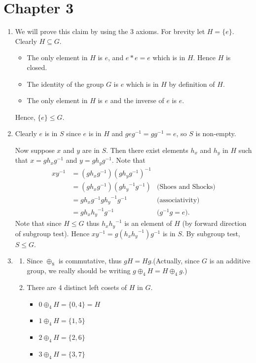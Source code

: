 \section*{Chapter 3}
\begin{enumerate}
    \item We will prove this claim by using the 3 axioms. For brevity let $H = \{e\}$. Clearly $H \subseteq G$.
    \begin{itemize}
        \item The only element in $H$ is $e$, and $e \ast e = e$ which is in $H$. Hence $H$ is closed.
        \item The identity of the group $G$ is $e$ which is in $H$ by definition of $H$.
        \item The only element in $H$ is $e$ and the inverse of $e$ is $e$.
    \end{itemize}
    Hence, $\{e\} \leq G$.

    \item Clearly $e$ is in $S$ since $e$ is in $H$ and $geg^{-1} = gg^{-1} = e$, so $S$ is non-empty.

    Now suppose $x$ and $y$ are in $S$. Then there exist elements $h_x$ and $h_y$ in $H$ such that $x = gh_xg^{-1}$ and $y = gh_yg^{-1}$. Note that
    \begin{align*}
        xy^{-1} &= (gh_xg^{-1})(gh_yg^{-1})^{-1}\\
        &= (gh_xg^{-1})(g{h_y}^{-1}g^{-1}) & \text{(Shoes and Shocks)}\\
        &= gh_xg^{-1}g{h_y}^{-1}g^{-1} & \text{(associativity)}\\
        &= gh_x{h_y}^{-1}g^{-1} & \text{(}g^{-1}g = e\text{)}.
    \end{align*}
    Note that since $H \leq G$ thus $h_x{h_y}^{-1}$ is an element of $H$ (by forward direction of subgroup test). Hence $xy^{-1} = g(h_x{h_y}^{-1})g^{-1}$ is in $S$. By subgroup test, $S \leq G$.

    \item \begin{enumerate}[label=(\alph*)]
        \item Since $\oplus_8$ is commutative, thus $gH = Hg$.\newline(Actually, since $G$ is an additive group, we really should be writing $g \oplus_4 H = H \oplus_4 g$.)
        \item There are 4 distinct left cosets of $H$ in $G$.
        \begin{itemize}
            \item $0 \oplus_4 H = \{0, 4\} = H$
            \item $1 \oplus_4 H = \{1, 5\}$
            \item $2 \oplus_4 H = \{2, 6\}$
            \item $3 \oplus_4 H = \{3, 7\}$
        \end{itemize}
    \end{enumerate}


\end{enumerate}
